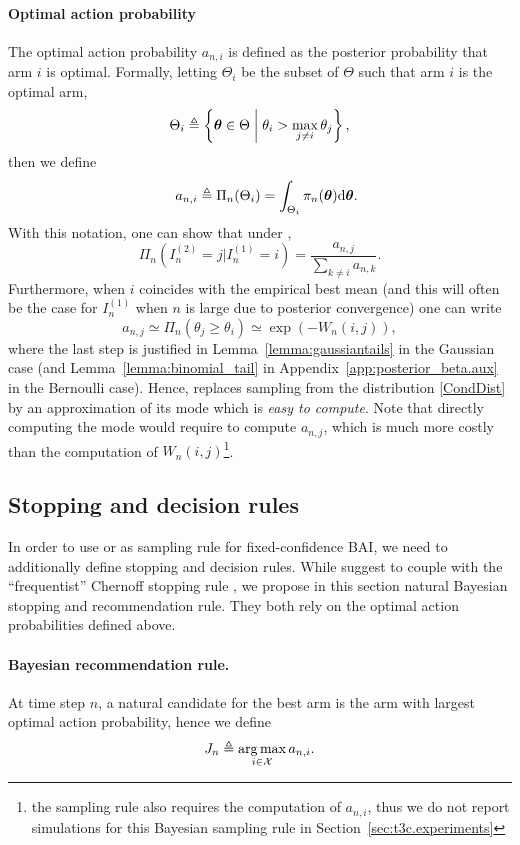 \paragraph{Optimal action probability} The optimal action probability $a_{n,i}$ is defined as the posterior probability that arm $i$ is optimal. Formally, letting $\Theta_i$ be the subset of $\Theta$ such that arm $i$ is the optimal arm,
\[
    \Theta_i \triangleq \left\{ {\boldsymbol \theta}\in\Theta \biggm| \theta_i > \max_{j\neq i}\theta_j \right\},
\]
then we define
\[
   \quad a_{n,i} \triangleq \Pi_{n}(\Theta_i) = \int_{\Theta_i} \pi_n({\boldsymbol \theta}) \text{d} {\boldsymbol \theta}.
\]
With this notation, one can show that under \TTTS, 
\begin{equation}\label{CondDist}
    \Pi_n\left(I_n^{(2)} =j | I_n^{(1)} = i\right) = \frac{a_{n,j}}{\sum_{k\neq i} a_{n,k}}.
\end{equation}
Furthermore, when $i$ coincides with the empirical best mean (and this will often be the case for $I_n^{(1)}$ when $n$ is large due to posterior convergence) one can write 
\[a_{n,j} \simeq \Pi_n\left(\theta_j \geq \theta_{i}\right) \simeq \exp\left(-W_n(i,j)\right),\]
where the last step is justified in Lemma~\ref{lemma:gaussiantails} in the Gaussian case (and Lemma~\ref{lemma:binomial_tail} in Appendix~\ref{app:posterior_beta.aux} in the Bernoulli case). Hence, \TCC replaces sampling from the distribution \eqref{CondDist} by an approximation of its mode which is \emph{easy to compute}. Note that directly computing the mode would require to compute $a_{n,j}$, which is much more costly than the computation of $W_{n}(i,j)$\footnote{the \TTPS sampling rule \citep{russo2016ttts} also requires the computation of $a_{n,i}$, thus we do not report simulations for this Bayesian sampling rule in Section~\ref{sec:t3c.experiments}}. 

\subsection{Stopping and decision rules}

In order to use \TTTS or \TCC as sampling rule for fixed-confidence BAI, we need to additionally define stopping and decision rules. While \cite{qin2017ttei} suggest to couple \TTEI with the ``frequentist'' Chernoff stopping rule \citep{garivier2016tracknstop}, we propose in this section natural Bayesian stopping and recommendation rule. They both rely on the optimal action probabilities defined above.

\paragraph{Bayesian recommendation rule.} 
At time step $n$, a natural candidate for the best arm is the arm with largest optimal action probability, hence we define 
\[
    J_n \triangleq \operatorname*{arg\,max}_{i\in\mathcal{X}} a_{n,i}.
\]

